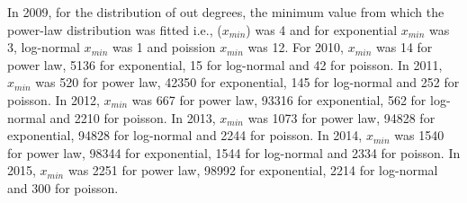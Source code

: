 \documentclass[preprint,12pt]{elsarticle}
\begin{document}
\begin{table}[H]
\centering
\caption{Likelihood ratio tests for comparing in degree distribution (2016-2020)}
\label{indeg2}
\end{table}


In 2009, for the distribution of out degrees, the minimum value from which the power-law distribution was fitted i.e., ($x_{min}$) was 4 and for exponential $x_{min}$ was 3, log-normal $x_{min}$ was 1 and poission $x_{min}$ was 12. For 2010, $x_{min}$ was 14 for power law, 5136 for exponential, 15 for log-normal and 42 for poisson. In 2011, $x_{min}$ was 520 for power law, 42350 for exponential, 145 for log-normal and 252 for poisson. In 2012, $x_{min}$ was 667 for power law, 93316 for exponential, 562 for log-normal and 2210 for poisson. In 2013, $x_{min}$ was 1073 for power law, 94828 for exponential, 94828 for log-normal and 2244 for poisson. In 2014, $x_{min}$ was 1540 for power law, 98344 for exponential, 1544 for log-normal and 2334 for poisson. In 2015, $x_{min}$ was 2251 for power law, 98992 for exponential, 2214 for log-normal and 300 for poisson. 
\end{document}
